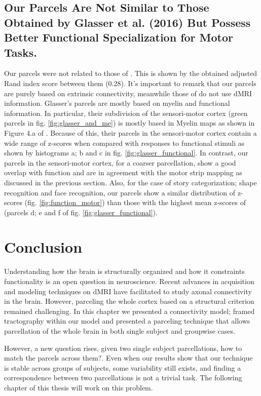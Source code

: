\subsection{Our Parcels Are Not Similar to Those Obtained by Glasser et al. (2016) But 
			Possess Better Functional Specialization for Motor Tasks.}
Our parcels were not related to those of \citet{Glasser2016}. This is shown by the
obtained adjusted Rand index score between them (0.28). It's important to remark that
our parcels are purely based on extrinsic connectivity, meanwhile those of \citet{Glasser2016}
do not use dMRI information. Glasser's parcels are mostly based on myelin and functional information.
In particular, their subdivision of the sensori-motor cortex (green parcels in fig.
\ref{fig:glasser_and_me}) is mostly based in Myelin maps as shown in Figure 4.a of 
\citet{Glasser2016}. Because of this, their parcels in the sensori-motor cortex contain 
a wide range of z-scores when compared with responses to functional stimuli as shown by
histograms a; b and c in fig.
\ref{fig:glasser_functional}. In contrast, our parcels in the sensori-motor cortex,
for a coarser parcellation, show a good overlap with function and are in agreement with
the motor strip mapping as discussed in the previous section. Also, for the case of story
categorization; shape recognition and face recognition, our parcels show a similar
distribution of z-scores (fig. \ref{fig:function_motor}) than those with the highest 
mean z-scores of \citet{Glasser2016} (parcels d; e and f of  fig. \ref{fig:glasser_functional}).
%
\section{Conclusion}
%
Understanding how the brain is structurally organized and how it constraints
functionality is an open question in neuroscience. Recent advances in
acquisition and modeling techniques on dMRI have facilitated to study 
axonal connectivity in the brain. However, parceling the whole cortex based
on a structural criterion remained challenging. In this chapter we presented a 
connectivity model; framed tractography within our model and 
presented a parceling technique that allows parcellation
of the whole brain in both single subject and groupwise cases.

However, a new question rises, given two single subject parcellations, how to
match the parcels across them?. Even when our results show that our technique is stable
across groups of subjects, some variability still exists, and finding a
correspondence between two parcellations is not a trivial task. The 
following chapter of this thesis will work on this problem.

%
\chapterbib
